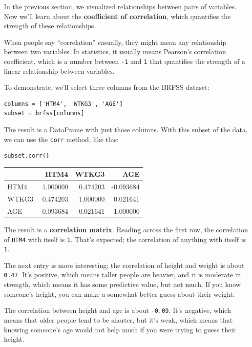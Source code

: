 In the previous section, we visualized relationships between pairs of
variables. Now we'll learn about the \textbf{coefficient of
correlation}, which quantifies the strength of these relationships.

When people say ``correlation'' casually, they might mean any
relationship between two variables. In statistics, it usually means
Pearson's correlation coefficient, which is a number between
\passthrough{\lstinline!-1!} and \passthrough{\lstinline!1!} that
quantifies the strength of a linear relationship between variables.

To demonstrate, we'll select three columns from the BRFSS dataset:

\begin{lstlisting}[]
columns = ['HTM4', 'WTKG3', 'AGE']
subset = brfss[columns]
\end{lstlisting}

The result is a DataFrame with just those columns. With this subset of
the data, we can use the \passthrough{\lstinline!corr!} method, like
this:

\begin{lstlisting}[]
subset.corr()
\end{lstlisting}

\begin{tabular}{lrrr}
\midrule
{} &      HTM4 &     WTKG3 &       AGE \\
\midrule
HTM4  &  1.000000 &  0.474203 & -0.093684 \\
WTKG3 &  0.474203 &  1.000000 &  0.021641 \\
AGE   & -0.093684 &  0.021641 &  1.000000 \\
\midrule
\end{tabular}

The result is a \textbf{correlation matrix}. Reading across the first
row, the correlation of \passthrough{\lstinline!HTM4!} with itself is
\passthrough{\lstinline!1!}. That's expected; the correlation of
anything with itself is \passthrough{\lstinline!1!}.

The next entry is more interesting; the correlation of height and weight
is about \passthrough{\lstinline!0.47!}. It's positive, which means
taller people are heavier, and it is moderate in strength, which means
it has some predictive value, but not much. If you know someone's
height, you can make a somewhat better guess about their weight.

The correlation between height and age is about
\passthrough{\lstinline!-0.09!}. It's negative, which means that older
people tend to be shorter, but it's weak, which means that knowing
someone's age would not help much if you were trying to guess their
height.

